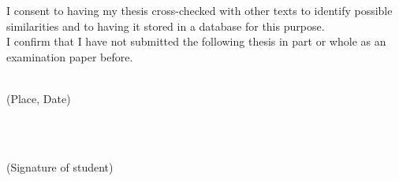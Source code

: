 \vspace*{2cm}

I consent to having my thesis cross-checked with other texts to identify possible similarities and to having it stored in a database for this purpose. \\
I confirm that I have not submitted the following thesis in part or whole as an examination paper before.

\vspace*{2cm}

\begin{minipage}{0.5\textwidth}
  \begin{flushleft} \large
    \underline{\hspace{6cm}} \\
    {\footnotesize (Place, Date)}
  \end{flushleft}
\end{minipage}
~
\begin{minipage}{0.5\textwidth}
  \begin{flushright} \large
    \underline{\hspace{6cm}} \\
    {\footnotesize (Signature of student)}
  \end{flushright}
\end{minipage}\\[0.5cm]